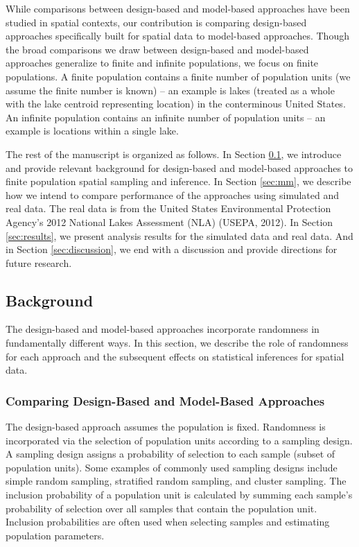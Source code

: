 \documentclass[]{elsarticle} %
\begin{document}
While comparisons between design-based and model-based approaches have
been studied in spatial contexts, our contribution is comparing
design-based approaches specifically built for spatial data to
model-based approaches. Though the broad comparisons we draw between
design-based and model-based approaches generalize to finite and
infinite populations, we focus on finite populations. A finite
population contains a finite number of population units (we assume the
finite number is known) -- an example is lakes (treated as a whole with
the lake centroid representing location) in the conterminous United
States. An infinite population contains an infinite number of population
units -- an example is locations within a single lake.

The rest of the manuscript is organized as follows. In Section
\ref{sec:background}, we introduce and provide relevant background for
design-based and model-based approaches to finite population spatial
sampling and inference. In Section \ref{sec:mm}, we describe how we
intend to compare performance of the approaches using simulated and real
data. The real data is from the United States Environmental Protection
Agency's 2012 National Lakes Assessment (NLA) (USEPA, 2012). In Section
\ref{sec:results}, we present analysis results for the simulated data
and real data. And in Section \ref{sec:discussion}, we end with a
discussion and provide directions for future research.

\hypertarget{sec:background}{%
\subsection{Background}\label{sec:background}}

The design-based and model-based approaches incorporate randomness in
fundamentally different ways. In this section, we describe the role of
randomness for each approach and the subsequent effects on statistical
inferences for spatial data.

\hypertarget{subsec:dvm_compare}{%
\subsubsection{Comparing Design-Based and Model-Based
Approaches}\label{subsec:dvm_compare}}

The design-based approach assumes the population is fixed. Randomness is
incorporated via the selection of population units according to a
sampling design. A sampling design assigns a probability of selection to
each sample (subset of population units). Some examples of commonly used
sampling designs include simple random sampling, stratified random
sampling, and cluster sampling. The inclusion probability of a
population unit is calculated by summing each sample's probability of
selection over all samples that contain the population unit. Inclusion
probabilities are often used when selecting samples and estimating
population parameters.
\end{document}
